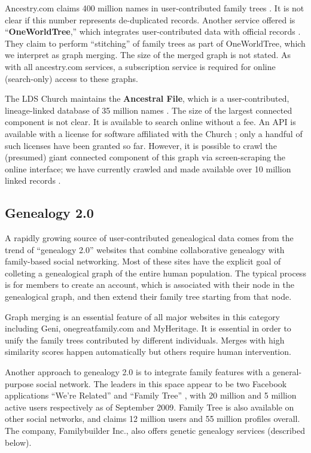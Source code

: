 \documentclass{article}
\begin{document}
Ancestry.com claims 400 million names in user-contributed family trees \cite{ancestry.com-worldtree}. It is not clear if this number represents de-duplicated records. Another service offered is ``{\bf OneWorldTree},'' which integrates user-contributed data with official records \cite{ancestry.com-oneworldtree}. They claim to perform ``stitching'' of family trees as part of OneWorldTree, which we interpret as graph merging. The size of the merged graph is not stated. As with all ancestry.com services, a subscription service is required for online (search-only) access to these graphs.

The LDS Church maintains the {\bf Ancestral File}, which is a user-contributed, lineage-linked database of 35 million names \cite{familysearch-ancestralfile}. The size of the largest connected component is not clear. It is available to search online without a fee. An API is available with a license for software affiliated with the Church \cite{familysearch-devnet}; only a handful of such licenses have been granted so far. However, it is possible to crawl the (presumed) giant connected component of this graph via screen-scraping the online interface; we have currently crawled and made available over 10 million linked records \cite{crawl}.

\subsection{Genealogy 2.0} A rapidly growing source of user-contributed genealogical data comes from the trend of ``genealogy 2.0'' websites that combine collaborative genealogy with family-based social networking. Most of these sites have the explicit goal of colleting a genealogical graph of the entire human population. The typical process is for members to create an account, which is associated with their node in the genealogical graph, and then extend their family tree starting from that node.

Graph merging is  an essential feature of all major websites in this category including Geni\cite{geni-merge}, onegreatfamily.com\cite{onegreatfamily-merge} and MyHeritage\cite{myheritage-merge}.  It is essential in order to unify the family trees contributed by different individuals.  Merges with high similarity scores happen automatically but others require human intervention.

Another approach to genealogy 2.0 is to integrate family features with a general-purpose social network. The leaders in this space appear to be two Facebook applications ``We're Related'' \cite{fb-wererelated} and ``Family Tree'' \cite{fb-familytree}, with 20 million and 5 million active users respectively as of September 2009. Family Tree is also available on other social networks, and claims 12 million users and 55 million profiles overall. 
The company, Familybuilder Inc., also offers genetic genealogy services (described below).
\end{document}

